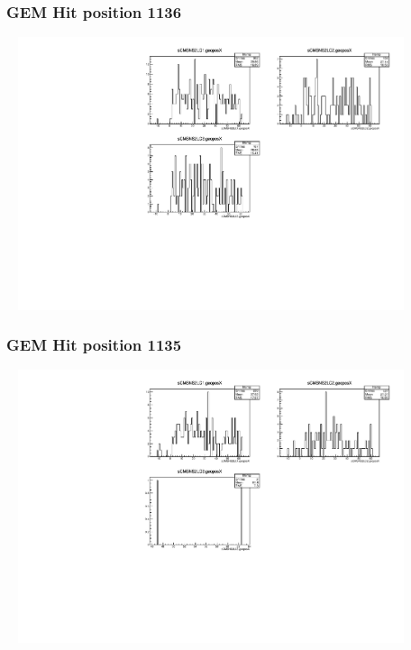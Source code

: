 \documentclass[slidestop,compress,mathserif]{beamer}
\begin{document}
\begin{frame}\frametitle{GEM Hit position 1136}
	 \includegraphics[width=12cm,height=8cm]{GEM_Hit_position_1136.pdf}
\end{frame}
\begin{frame}\frametitle{GEM Hit position 1135}
	 \includegraphics[width=12cm,height=8cm]{GEM_Hit_position_1135.pdf}
\end{frame}
\end{document}
